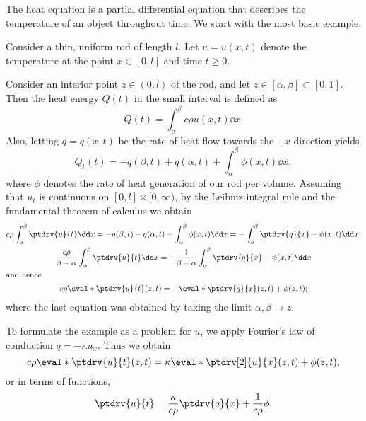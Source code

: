 \label{sec:heat}

The heat equation is a partial differential equation
that describes the temperature of an object throughout time.
We start with the most basic example.

\begin{example}
    \label{exm:heat}
    Consider a thin, uniform rod of length \(l\).
    Let \(u=u(x,t)\) denote the temperature
    at the point \(x\in[0,l]\) and time \(t\ge 0\).
    
    Consider an interior point \(z\in(0,l)\) of the rod,
    and let \(z\in[\alpha,\beta]\subset[0,1]\).
    Then the heat energy \(Q(t)\) in the small interval is defined as
    \[
        Q(t)
        =\int_{\alpha}^{\beta}c\rho u(x,t)\dd x.
    \]
    Also, letting \(q=q(x,t)\) be the rate of heat flow
    towards the \(+x\) direction yields
    \[
        Q_t(t)
        =-q(\beta,t)+q(\alpha,t)+\int_{\alpha}^{\beta}\phi(x,t)\dd x,
    \]
    where \(\phi\) denotes the rate of 
    heat generation of our rod per volume.
    Assuming that \(u_t\) is continuous on \([0,l]\times[0,\infty)\),
    by the Leibniz integral rule
    and the fundamental theorem of calculus we obtain
    \begin{gather*}
        c\rho\int_{\alpha}^{\beta}\ptdrv{u}{t}\dd x
        =-q(\beta,t)+q(\alpha,t)+\int_{\alpha}^{\beta}\phi(x,t)\dd x
        =-\int_{\alpha}^{\beta}\ptdrv{q}{x}-\phi(x,t)\dd x, \\
        \frac{c\rho}{\beta-\alpha}
            \int_{\alpha}^{\beta}\ptdrv{u}{t}\dd x
        =-\frac{1}{\beta-\alpha}
            \int_{\alpha}^{\beta}\ptdrv{q}{x}-\phi(x,t)\dd x \\
        \intertext{and hence}
        c\rho\eval*{\ptdrv{u}{t}}{(z,t)}
        =-\eval*{\ptdrv{q}{x}}{(z,t)}+\phi(z,t);
    \end{gather*}
    where the last equation was obtained by taking the limit
    \(\alpha,\beta\to z\).

    To formulate the example as a problem for \(u\),
    we apply Fourier's law of conduction \(q=-\kappa u_x\).
    Thus we obtain
    \[
        c\rho\eval*{\ptdrv{u}{t}}{(z,t)}
        =\kappa\eval*{\ptdrv[2]{u}{x}}{(z,t)}+\phi(z,t),
    \]
    or in terms of functions,
    \begin{equation}
        \label{eq:heat}
        \ptdrv{u}{t}
        =\frac{\kappa}{c\rho}\ptdrv{q}{x}+\frac{1}{c\rho}\phi.
    \end{equation}
\end{example}

